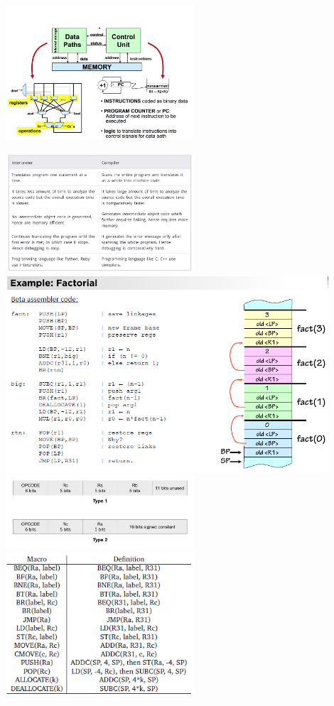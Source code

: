 \documentclass[9pt,landscape]{extarticle}
\begin{document}
\begin{multicols*}{4}
\includegraphics[width = 7cm]{CPU_anatomy}

\includegraphics[width = 7cm]{Interpreter_Compiler}
\includegraphics[width = 12cm]{Stackframe}
\includegraphics[width = 7cm]{beta_instruction_format}
\includegraphics[width = 7cm]{Macro}

\end{multicols*}
\end{document}
